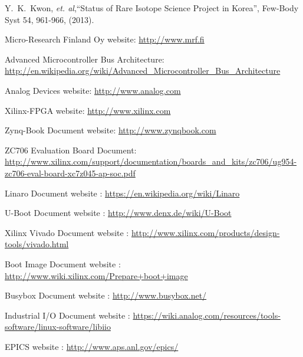 \documentclass[a4paper,
              ]{jacow}
\begin{document}
\begin{thebibliography}{9}   %

 Y.~K.~Kwon, {\it et. al},``Status of Rare Isotope Science Project in Korea'',
Few-Body Syst 54, 961-966, (2013).

Micro-Research Finland Oy website:
\url{http://www.mrf.fi}%


Advanced Microcontroller Bus Architecture:
\url{http://en.wikipedia.org/wiki/Advanced_Microcontroller_Bus_Architecture}


Analog Devices website:
\url{http://www.analog.com}

Xilinx-FPGA website:
\url{http://www.xilinx.com}

Zynq-Book Document website:
\url{http://www.zynqbook.com}

ZC706 Evaluation Board Document:
\url{http://www.xilinx.com/support/documentation/boards_and_kits/zc706/ug954-zc706-eval-board-xc7z045-ap-soc.pdf}

Linaro Document website :
\url{https://en.wikipedia.org/wiki/Linaro}

U-Boot Document website :
\url{http://www.denx.de/wiki/U-Boot}


Xilinx Vivado Document website :
\url{http://www.xilinx.com/products/design-tools/vivado.html}

Boot Image Document website :
\url{http://www.wiki.xilinx.com/Prepare+boot+image}

Busybox Document website :
\url{http://www.busybox.net/}

Industrial I/O Document website :
\url{https://wiki.analog.com/resources/tools-software/linux-software/libiio}

EPICS website :
\url{http://www.aps.anl.gov/epics/}


\end{thebibliography}

\fi
\end{document}
